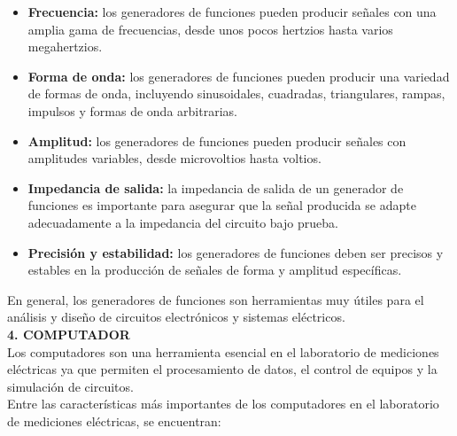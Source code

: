 \documentclass[12pt]{article}
\begin{document}
	\begin{itemize}
		\item \textbf{Frecuencia:} los generadores de funciones pueden producir señales con una amplia gama de frecuencias, desde unos pocos hertzios hasta varios megahertzios.
		\item \textbf{Forma de onda:} los generadores de funciones pueden producir una variedad de formas de onda, incluyendo sinusoidales, cuadradas, triangulares, rampas, impulsos y formas de onda arbitrarias.
		\item \textbf{Amplitud:} los generadores de funciones pueden producir señales con amplitudes variables, desde microvoltios hasta voltios.
		\item \textbf{Impedancia de salida:} la impedancia de salida de un generador de funciones es importante para asegurar que la señal producida se adapte adecuadamente a la impedancia del circuito bajo prueba.
		\item \textbf{Precisión y estabilidad:} los generadores de funciones deben ser precisos y estables en la producción de señales de forma y amplitud específicas.
	\end{itemize}
	
	En general, los generadores de funciones son herramientas muy útiles para el análisis y diseño de circuitos electrónicos y sistemas eléctricos.\\
	
	\textbf{4. COMPUTADOR}\\
	
	Los computadores son una herramienta esencial en el laboratorio de mediciones eléctricas ya que permiten el procesamiento de datos, el control de equipos y la simulación de circuitos.\\
	
	Entre las características más importantes de los computadores en el laboratorio de mediciones eléctricas, se encuentran:\\
	
\end{document}
